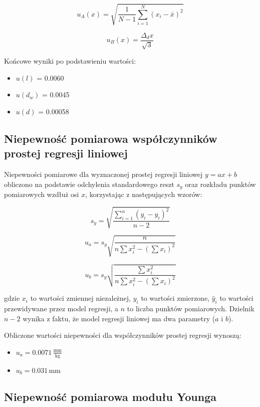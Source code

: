 \documentclass[a4paper,12pt]{article}
\begin{document}
\begin{equation}
\label{eq:u_A}
u_A(x) = \sqrt{\frac{1}{N-1} \sum_{i=1}^{N} (x_i - \bar{x})^2}
\end{equation}

\begin{equation}
\label{eq:u_B}
u_B(x) = \frac{\Delta_d x}{\sqrt{3}}
\end{equation}

Końcowe wyniki po podstawieniu wartości:

\begin{itemize}
\item $u(l)$ = 0.0060\,
\item $u(d_w)$ = 0.0045 
\item $u(d)$ = 0.00058\,
\end{itemize}

\subsection{Niepewność pomiarowa współczynników prostej regresji liniowej}

Niepewności pomiarowe dla wyznaczonej prostej regresji liniowej $y = ax + b$ obliczono na podstawie odchylenia standardowego reszt $s_y$ oraz rozkładu punktów pomiarowych wzdłuż osi $x$, korzystając z następujących wzorów:

\[
s_y = \sqrt{\frac{\sum_{i=1}^{n} (y_i - \hat{y}_i)^2}{n-2}}
\]

\[
u_a = s_y \sqrt{\frac{n}{n \sum x_i^2 - \left( \sum x_i \right)^2}}
\]

\[
u_b = s_y \sqrt{\frac{\sum x_i^2}{n \sum x_i^2 - \left( \sum x_i \right)^2}}
\]

gdzie $x_i$ to wartości zmiennej niezależnej, $y_i$ to wartości zmierzone, $\hat{y}_i$ to wartości przewidywane przez model regresji, a $n$ to liczba punktów pomiarowych. Dzielnik $n-2$ wynika z faktu, że model regresji liniowej ma dwa parametry ($a$ i $b$).


Obliczone wartości niepewności dla współczynników prostej regresji wynoszą:

\begin{itemize}
    \item $u_a = 0.0071\,\frac{\text{mm}}{\text{kg}}$
    \item $u_b = 0.031\,\text{mm}$
\end{itemize}

\subsection{Niepewność pomiarowa modułu Younga}
\end{document}
